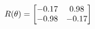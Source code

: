 \documentclass[preview]{standalone}
\begin{document}
\begin{align*}
\special{dvisvgm:raw <g id='unique000'>}R(\theta) = \begin{bmatrix}-0.17 & 0.98\\-0.98 & -0.17\end{bmatrix}\special{dvisvgm:raw </g>}
\end{align*}
\end{document}

